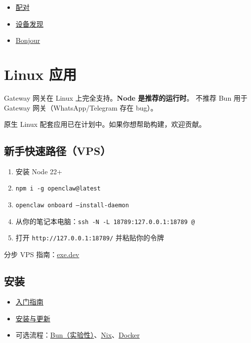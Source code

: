 \begin{itemize}
  \item \href{/gateway/pairing}{配对}
  \item \href{/gateway/discovery}{设备发现}
  \item \href{/gateway/bonjour}{Bonjour}
\end{itemize}



\clearpage

\section{Linux 应用}


Gateway 网关在 Linux 上完全支持。\textbf{Node 是推荐的运行时}。
不推荐 Bun 用于 Gateway 网关（WhatsApp/Telegram 存在 bug）。

原生 Linux 配套应用已在计划中。如果你想帮助构建，欢迎贡献。

\subsection{新手快速路径（VPS）}


\begin{enumerate}
  \item 安装 Node 22+
  \item \texttt{npm i -g openclaw@latest}
  \item \texttt{openclaw onboard --install-daemon}
  \item 从你的笔记本电脑：\texttt{ssh -N -L 18789:127.0.0.1:18789 @}
  \item 打开 \texttt{http://127.0.0.1:18789/} 并粘贴你的令牌
\end{enumerate}


分步 VPS 指南：\href{/install/exe-dev}{exe.dev}

\subsection{安装}


\begin{itemize}
  \item \href{/start/getting-started}{入门指南}
  \item \href{/install/updating}{安装与更新}
  \item 可选流程：\href{/install/bun}{Bun（实验性）}、\href{/install/nix}{Nix}、\href{/install/docker}{Docker}
\end{itemize}


